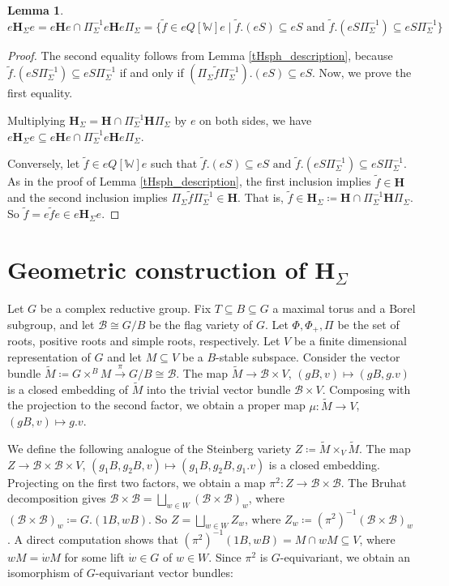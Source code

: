 \documentclass[11pt]{article}
\newcommand{\B}{\mathcal{B}}
\renewcommand{\H}{\textbf{H}}
\newcommand{\1}{\mathbb{1}}
\newcommand{\tW}{\mathbb{W}}
\newcommand{\tf}{\widetilde{f}}
\newcommand{\tM}{\widetilde{M}}
\renewcommand{\subset}{\subseteq}
\newtheorem{lemma}[theorem]{Lemma}
\theoremstyle{definition}
\numberwithin{equation}{section}
\begin{document}
\begin{lemma}
\label{H_Sigma_sph_description}
    $$e \H_\Sigma e = e\H e \cap \Pi_\Sigma^{-1} e \H e \Pi_\Sigma = \{\tf\in e Q[\tW] e \mid \tf . (eS) \subset eS\text{ and } \tf.(eS\Pi_\Sigma^{-1}) \subset eS\Pi_\Sigma^{-1}\} $$
\end{lemma}

\begin{proof}
The second equality follows from Lemma \ref{tHsph_description}, because $\tf.(eS\Pi_\Sigma^{-1}) \subset eS\Pi_\Sigma^{-1}$ if and only if $(\Pi_\Sigma \tf \Pi_\Sigma^{-1}) . (eS) \subset eS$. Now, we prove the first equality.

Multiplying  $\H_\Sigma = \H \cap \Pi_\Sigma^{-1} \H \Pi_\Sigma$ by $e$ on both sides, we have $e \H_\Sigma e \subset e \H e \cap \Pi_\Sigma^{-1} e \H e \Pi_\Sigma$.

Conversely, let $\tf\in e Q[\tW] e$ such that $\tf . (eS) \subset eS\text{ and } \tf.(eS\Pi_\Sigma^{-1}) \subset eS\Pi_\Sigma^{-1}$. As in the proof of Lemma \ref{tHsph_description}, the first inclusion implies $\tf \in \H$ and the second inclusion implies $\Pi_\Sigma \tf \Pi_\Sigma^{-1} \in \H$. That is, $\tf \in \H_\Sigma \coloneqq \H \cap \Pi_\Sigma^{-1} \H \Pi_\Sigma$. So $\tf = e \tf e \in e \H_\Sigma e$.
\end{proof}

\section{Geometric construction of $\H_\Sigma$}
\label{section_finite}

Let $G$ be a complex reductive group. Fix $T\subset B\subset G$ a maximal torus and a Borel subgroup, and let $\B\cong G/B$ be the flag variety of $G$. Let $\Phi, \Phi_+, \Pi$ be the set of roots, positive roots and simple roots, respectively. Let $V$ be a finite dimensional representation of $G$ and let $M \subset V$ be a $B$-stable subspace. Consider the vector bundle $\tM \coloneqq G\times^B M \xrightarrow{\pi} G/B\cong \B$. The map $\tM \rightarrow \B \times V$, $(gB,v) \mapsto (gB,g.v)$ is a closed embedding of $\tM$ into the trivial vector bundle $\B \times V$. Composing with the projection to the second factor, we obtain a proper map $\mu:\tM \rightarrow V$, $(gB,v) \mapsto g.v$.

We define the following analogue of the Steinberg variety $Z\coloneqq \tM \times_V \tM$. The map $Z \rightarrow \B \times\B\times V$, $(g_1B,g_2B,v) \mapsto (g_1B,g_2B, g_1.v)$ is a closed embedding. Projecting on the first two factors, we obtain a map $\pi^2 : Z\rightarrow \B\times \B$. The Bruhat decomposition gives $\B \times \B = \bigsqcup_{w\in W} (\B\times\B)_w$, where $(\B\times\B)_w\coloneqq G.(1B,wB)$. So $Z = \bigsqcup_{w\in W} Z_w$, where \mbox{$Z_w \coloneqq (\pi^2)^{-1}(\B\times \B)_w$}. A direct computation shows that $(\pi^2)^{-1}(1B, wB) = M \cap wM \subset V$, where $wM = \dot{w}M$ for some lift $\dot{w}\in G$ of $w\in W$. Since $\pi^2$ is $G$-equivariant, we obtain an isomorphism of $G$-equivariant vector bundles:
\end{document}
